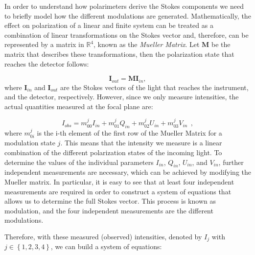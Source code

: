 In order to understand how polarimeters derive the Stokes components we need to briefly model how the different modulations are generated. Mathematically, the effect on polarization of a linear and finite system can be treated as a combination of linear transformations on the Stokes vector and, therefore, can be represented by a matrix in $\mathbb{R}^4$, known as the \textit{Mueller Matrix}. Let $\textbf{M}$ be the matrix that describes these transformations, then the polarization state that reaches the detector follows:

\begin{equation}
  \textbf{I}_{out} = \textbf{M}\textbf{I}_{in},
  \label{eq_intro:modultaion_eqs}
\end{equation}
where $\textbf{I}_{in}$ and $\textbf{I}_{out}$ are the Stokes vectors of the light that reaches the instrument, and the detector, respectively. However, since we only measure intensities, the actual quantities measured at the focal plane are: 

\begin{equation}
  I_{obs} = m^j_{00}I_{in} + m^j_{01}Q_{in} + m^j_{02}U_{in} + m^j_{03}V_{in} \ \ ,
\end{equation}
where $m ^j _{0i}$ is the i-th element of the first row of the Mueller Matrix for a modulation state $j$. This means that the intensity we measure is a linear combination of the different polarization states of the incoming light. To determine the values of the individual parameters $I_{in}$, $Q_{in}$, $U_{in}$, and $V_{in}$, further independent measurements are necessary, which can be achieved by modifying the Mueller matrix. In particular, it is easy to see that at least four independent measurements are required in order to construct a system of equations that allows us to determine the full Stokes vector. This process is known as modulation, and the four independent measurements are the different modulations.

Therefore, with these measured (observed) intensities, denoted by  $I _ j$ with $j \in \left\{ 1, 2, 3, 4\right\}$, we can build a system of equations:

